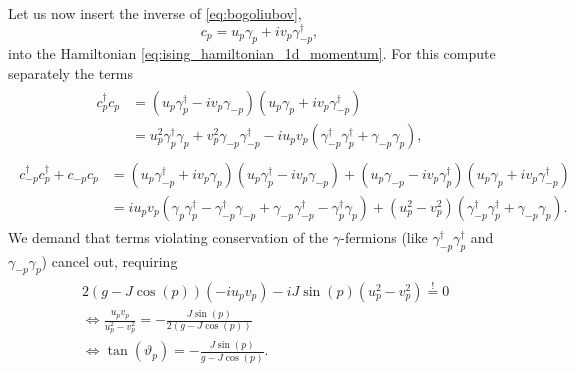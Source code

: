 Let us now insert the inverse of \eqref{eq:bogoliubov}, 
\begin{equation}
	c_p = u_p \gamma_p + i v_p \gamma_{-p}^{\dagger},
\end{equation}
into the Hamiltonian \eqref{eq:ising_hamiltonian_1d_momentum}. For this compute separately the terms
\begin{align}
\begin{split}
	c_p^{\dagger}c_p &= (u_p \gamma_p^{\dagger} - i v_p \gamma_{-p})(u_p \gamma_p + i v_p \gamma_{-p}^{\dagger}) \\
	&= u_p^2 \gamma_p^{\dagger} \gamma_p + v_p^2 \gamma_{-p}\gamma_{-p}^{\dagger} - i u_p v_p (\gamma_{-p}^{\dagger}\gamma_{p}^{\dagger} + \gamma_{-p}\gamma_p),
\end{split}
\end{align}
\begin{align}
\begin{split}
c_{-p}^{\dagger}c_p^{\dagger} + c_{-p}c_p &= (u_p \gamma_{-p}^{\dagger} + i v_p \gamma_{p})(u_p \gamma_p^{\dagger} - i v_p \gamma_{-p}) + (u_p \gamma_{-p} - i v_p \gamma_{p}^{\dagger})(u_p \gamma_p + i v_p \gamma_{-p}^{\dagger}) \\
&= i u_p v_p (\gamma_p \gamma_p^{\dagger}- \gamma_{-p}^{\dagger} \gamma_{-p} +  \gamma_{-p}\gamma_{-p}^{\dagger} - \gamma_p^{\dagger}\gamma_p) + (u_p^2 - v_p^2)(\gamma_{-p}^{\dagger}\gamma_{p}^{\dagger} + \gamma_{-p}\gamma_p).
\end{split}
\end{align}
We demand that terms violating conservation of the $\gamma$-fermions (like $\gamma_{-p}^{\dagger}\gamma_{p}^{\dagger}$ and $\gamma_{-p}\gamma_p$) cancel out, requiring
\begin{align}\label{eq:tan_vartheta}
\begin{split}
	& 2(g - J\cos(p))(-i u_p v_p) - iJ\sin(p)(u_p^2 - v_p^2) \overset{!}{=} 0 \\
	&\Leftrightarrow \frac{u_p v_p}{u_p^2 - v_p^2} = -\frac{J\sin(p)}{2(g - J\cos(p))} \\
	&\Leftrightarrow \tan(\vartheta_p) = -\frac{J\sin(p)}{g - J\cos(p)}.
\end{split}
\end{align}

